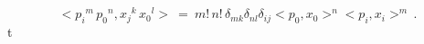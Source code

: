 \begin{equation} < {p_i}^m\,{p_0}^n , {x_j}^k\,{x_0}^l
> \ = \ m!\,n!\,\delta_{m k} \delta_{n l} \delta_{i j} < p_0 ,x_0
>^n < p_i , x_i >^m\, .\label{r29}\end{equation}t

